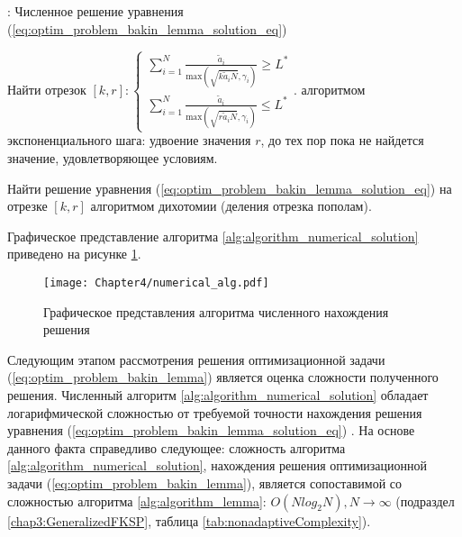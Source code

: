 \begin{algorithm}
  \caption{: Численное решение уравнения (\ref{eq:optim_problem_bakin_lemma_solution_eq})}
	\label{alg:algorithm_numerical_solution}
  \begin{algorithmic}[1]
	 \item Найти отрезок $[k,r]:\begin{cases}
		\sum\limits_{i=1}^{N} {\frac{\tilde{a}_i}{\mathrm{max} \left(\sqrt{k \tilde{a}_i N}, \gamma_i\right)}} \geq L^{*} \\
		\sum\limits_{i=1}^{N} {\frac{\tilde{a}_i}{\mathrm{max} \left(\sqrt{r \tilde{a}_i N}, \gamma_i\right)}} \leq L^{*}
		\end{cases}.$
		\newline
		алгоритмом экспоненциального шага: удвоение значения $r$, до тех пор пока не найдется значение, удовлетворяющее условиям.
	 \item Найти решение уравнения (\ref{eq:optim_problem_bakin_lemma_solution_eq}) на отрезке $[k,r]$ алгоритмом дихотомии (деления отрезка пополам).
  \end{algorithmic}
\end{algorithm}
Графическое представление алгоритма \ref{alg:algorithm_numerical_solution} приведено на рисунке \ref{fig:numerical_alg}.

\begin{figure}[htbp]
\begin{center}
\texttt{[image: Chapter4/numerical\_alg.pdf]}
\caption{Графическое представления алгоритма численного нахождения решения}
\label{fig:numerical_alg}
\end{center}
\end{figure}

Следующим этапом рассмотрения решения оптимизационной задачи (\ref{eq:optim_problem_bakin_lemma}) является оценка сложности полученного решения. Численный алгоритм \ref{alg:algorithm_numerical_solution} обладает логарифмической сложностью от требуемой точности нахождения решения уравнения (\ref{eq:optim_problem_bakin_lemma_solution_eq}) \cite{convex_opt, Bakin_Globecom}. На основе данного факта справедливо следующее: сложность алгоритма \ref{alg:algorithm_numerical_solution}, нахождения решения оптимизационной задачи (\ref{eq:optim_problem_bakin_lemma}), является сопоставимой со сложностью алгоритма \ref{alg:algorithm_lemma}: $O(N log_2 N), N \to \infty$ (подраздел \ref{chap3:GeneralizedFKSP}, таблица \ref{tab:nonadaptiveComplexity}).


